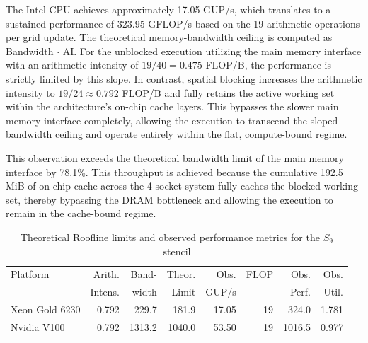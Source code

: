 The Intel CPU achieves approximately 17.05 GUP/s, which translates to a sustained performance of 323.95 GFLOP/s based on the 19 arithmetic operations per grid update. 
The theoretical memory-bandwidth ceiling is computed as Bandwidth $\cdot$ AI. 
For the unblocked execution utilizing the main memory interface with an arithmetic intensity of $19/40 = 0.475$ FLOP/B, the performance is strictly limited by this slope. 
In contrast, spatial blocking increases the arithmetic intensity to $19/24 \approx 0.792$ FLOP/B and fully retains the active working set within the architecture's on-chip cache layers. 
This bypasses the slower main memory interface completely, allowing the execution to transcend the sloped bandwidth ceiling and operate entirely within the flat, compute-bound regime.
 
This observation exceeds the theoretical bandwidth limit of the main memory interface by 78.1\%.
This throughput is achieved because the cumulative 192.5 MiB of on-chip cache across the 4-socket system fully caches the blocked working set, thereby bypassing the DRAM bottleneck and allowing the execution to remain in the cache-bound regime.


\begin{table}[h]
\centering
\begin{tabular}{lrrrrrrr}
\hline
Platform & Arith. & Band- & Theor. & Obs. & FLOP & Obs. & Obs. \\
& Intens. & width & Limit & GUP/s & & Perf. & Util. \\\hline
Xeon Gold 6230 & 0.792 & 229.7 & 181.9 & 17.05 & 19 & 324.0 & 1.781 \\
Nvidia V100 & 0.792 & 1313.2 & 1040.0 & 53.50 & 19 & 1016.5 & 0.977 \\
\hline
\end{tabular}
\caption{Theoretical Roofline limits and observed performance metrics for the $S_9$ stencil}
\end{table}
 
